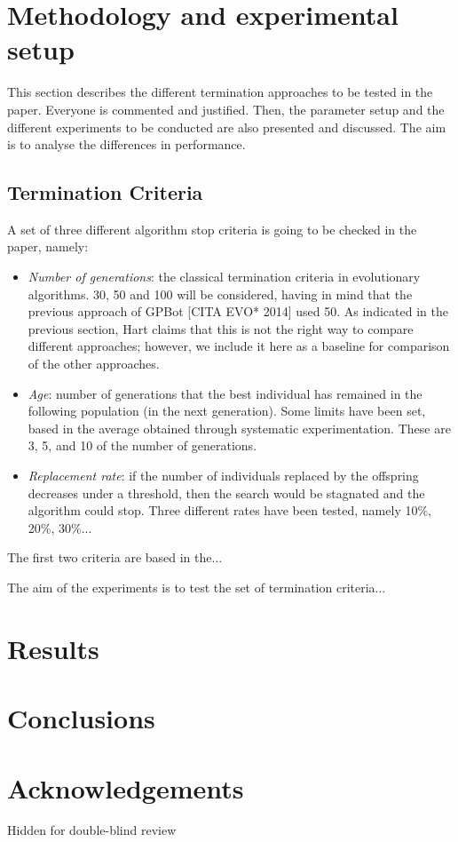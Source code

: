 \documentclass[runningheads,a4paper]{llncs}
\begin{document}

\section{Methodology and experimental setup}
\label{sec:met}

This section describes the different termination approaches to be tested in the paper. Everyone is commented and justified.
Then, the parameter setup and the different experiments to be conducted are also presented and discussed. The aim is to analyse the differences in performance.

\subsection{Termination Criteria}
A set of three different algorithm stop criteria is going to be checked in the paper, namely:
\begin{itemize}
    \item \textit{Number of generations}: the classical termination
      criteria in evolutionary algorithms. 30, 50 and 100 will be
      considered, having in mind that the previous approach of GPBot
      [CITA EVO* 2014] used 50. As indicated in the previous section,
      Hart  \cite{Hart1996} claims that this is not the right way to
      compare different approaches; however, we include it here as a
      baseline for comparison of the other approaches. 
    \item \textit{Age}: number of generations that the best individual has remained in the following population (in the next generation). Some limits have been set, based in the average obtained through systematic experimentation. These are 3, 5, and 10 of the number of generations.
    \item \textit{Replacement rate}: if the number of individuals
      replaced by the offspring decreases under a threshold, then the
      search would be stagnated and the algorithm could stop. Three
      different rates have been tested, namely 10\%, 20\%, 30\%... %
\end{itemize}

The first two criteria are based in the...

The aim of the experiments is to test the set of termination criteria...

\section{Results}
\label{sec:res}

\section{Conclusions}

\section*{Acknowledgements}

Hidden for double-blind review



\end{document}
